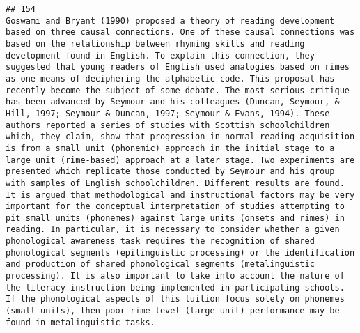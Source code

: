 \documentclass[
  english,
  man]{apa6}
\begin{document}
\begin{verbatim}
## 154                                                                                                                                                                                                                                                                                                                                                                                                                                                                                                                                                                                                                                                                                                                                                                                                        Goswami and Bryant (1990) proposed a theory of reading development based on three causal connections. One of these causal connections was based on the relationship between rhyming skills and reading development found in English. To explain this connection, they suggested that young readers of English used analogies based on rimes as one means of deciphering the alphabetic code. This proposal has recently become the subject of some debate. The most serious critique has been advanced by Seymour and his colleagues (Duncan, Seymour, & Hill, 1997; Seymour & Duncan, 1997; Seymour & Evans, 1994). These authors reported a series of studies with Scottish schoolchildren which, they claim, show that progression in normal reading acquisition is from a small unit (phonemic) approach in the initial stage to a large unit (rime-based) approach at a later stage. Two experiments are presented which replicate those conducted by Seymour and his group with samples of English schoolchildren. Different results are found. It is argued that methodological and instructional factors may be very important for the conceptual interpretation of studies attempting to pit small units (phonemes) against large units (onsets and rimes) in reading. In particular, it is necessary to consider whether a given phonological awareness task requires the recognition of shared phonological segments (epilinguistic processing) or the identification and production of shared phonological segments (metalinguistic processing). It is also important to take into account the nature of the literacy instruction being implemented in participating schools. If the phonological aspects of this tuition focus solely on phonemes (small units), then poor rime-level (large unit) performance may be found in metalinguistic tasks.

\end{verbatim}
\end{document}
